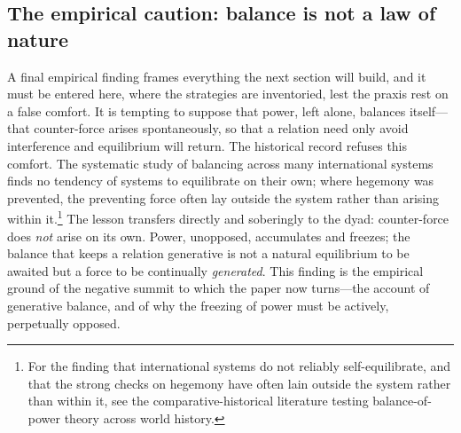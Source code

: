 \subsection{The empirical caution: balance is not a law of nature}
\label{p17:sub:practices-empirical}

A final empirical finding frames everything the next section will build, and it must be entered here, where the strategies are inventoried, lest the praxis rest on a false comfort. It is tempting to suppose that power, left alone, balances itself---that counter-force arises spontaneously, so that a relation need only avoid interference and equilibrium will return. The historical record refuses this comfort. The systematic study of balancing across many international systems finds no tendency of systems to equilibrate on their own; where hegemony was prevented, the preventing force often lay outside the system rather than arising within it.\footnote{For the finding that international systems do not reliably self-equilibrate, and that the strong checks on hegemony have often lain outside the system rather than within it, see the comparative-historical literature testing balance-of-power theory across world history.} The lesson transfers directly and soberingly to the dyad: counter-force does \emph{not} arise on its own. Power, unopposed, accumulates and freezes; the balance that keeps a relation generative is not a natural equilibrium to be awaited but a force to be continually \emph{generated}. This finding is the empirical ground of the negative summit to which the paper now turns---the account of generative balance, and of why the freezing of power must be actively, perpetually opposed.

